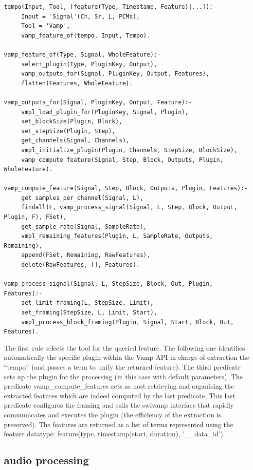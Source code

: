 \documentclass[runningheads]{llncs}
\begin{document}
\medskip
\noindent
\begin{verbatim}
tempo(Input, Tool, [feature(Type, Timestamp, Feature)|...]):-
     Input = 'Signal'(Ch, Sr, L, PCMs),
     Tool = 'Vamp',
     vamp_feature_of(tempo, Input, Tempo).

vamp_feature_of(Type, Signal, WholeFeature):-
     select_plugin(Type, PluginKey, Output),
     vamp_outputs_for(Signal, PluginKey, Output, Features),
     flatten(Features, WholeFeature).

vamp_outputs_for(Signal, PluginKey, Output, Feature):-
     vmpl_load_plugin_for(PluginKey, Signal, Plugin),
     set_blockSize(Plugin, Block),
     set_stepSize(Plugin, Step),
     get_channels(Signal, Channels),
     vmpl_initialize_plugin(Plugin, Channels, StepSize, BlockSize),
     vamp_compute_feature(Signal, Step, Block, Outputs, Plugin, WholeFeature).

vamp_compute_feature(Signal, Step, Block, Outputs, Plugin, Features):-
     get_samples_per_channel(Signal, L),
     findall(F, vamp_process_signal(Signal, L, Step, Block, Output, Plugin, F), FSet),
     get_sample_rate(Signal, SampleRate),
     vmpl_remaining_features(Plugin, L, SampleRate, Outputs, Remaining),
     append(FSet, Remaining, RawFeatures),
     delete(RawFeatures, [], Features).

vamp_process_signal(Signal, L, StepSize, Block, Out, Plugin, Features):-
     set_limit_framing(L, StepSize, Limit),
     set_framing(StepSize, L, Limit, Start),
     vmpl_process_block_framing(Plugin, Signal, Start, Block, Out, Features).

\end{verbatim}
\noindent

The first rule selects the tool for the queried feature. The following one identifies automatically the specific plugin within the Vamp API in charge of extraction the ``tempo'' (and passes a term to unify the returned feature). The third predicate sets up the plugin for the processing (in this case with default parameters). The predicate vamp\_compute\_features acts as host retrieving and organising the extracted features which are indeed computed by the last predicate. This last predicate configures the framing and calls the swivamp interface that rapidly communicates and executes the plugin (the efficiency of the extraction is preserved). The features are returned as a list of terms represented using the feature datatype: feature(type, timestamp(start, duration), '\_\_data\_id').

\subsection{audio processing}\label{subsec:swilasdpa}
\end{document}
